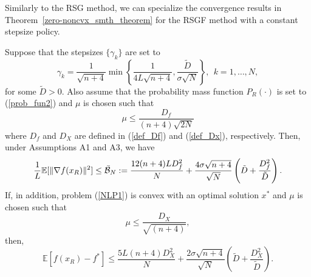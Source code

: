 \documentclass[final]{siamltex}
\newcommand{\beq}{\begin{equation}}
\newcommand{\eeq}{\end{equation}}
\def\eqnok#1{(\ref{#1})}
\def\vgap{\vspace*{.1in}}
\newcommand{\bbe}{\mathbb{E}}
\def\cB{{\cal B}}
\begin{document}
\vgap

Similarly to the RSG method, we can specialize the convergence results in
Theorem~\ref{zero-noncvx_smth_theorem} for the RSGF method with
a constant stepsize policy.

\begin{corollary}
Suppose that the stepsizes $\{\gamma_k\}$ are set to
\beq \label{zero_constant_step}
\gamma_k = \frac{1}{\sqrt{n+4}} \min \left\{ \frac{1}{4 L \sqrt{n+4}}, \frac{\tilde D}{\sigma \sqrt N}\right\}, \ \ k = 1, \ldots, N,
\eeq
for some $\tilde D >0$. Also assume that the probability mass function $P_R(\cdot)$
is set to \eqnok{prob_fun2} and $\mu$ is chosen such that
\beq \label{def_mu}
\mu \le \frac{D_f}{(n+4) \sqrt{2N}}
\eeq
where $D_f$ and $D_X$ are defined in \eqnok{def_Df} and \eqnok{def_Dx}, respectively.
Then, under Assumptions A1 and A3, we have
\beq \label{zero_nocvx_smooth}
\frac{1}{L} \bbe[\|\nabla f(x_R)\|^2] \le \bar {\cB}_N
:=\frac{12(n+4)L D_f^2}{N} + \frac{ 4 \sigma \sqrt {n+4} }{\sqrt{N}}\left(\tilde D + \frac{D_f^2}{\tilde D}\right) .
\eeq
If, in addition, problem \eqnok{NLP1} is convex with an optimal solution $x^*$
and $\mu$ is chosen such that
\[
\mu \le \frac{D_X}{\sqrt{(n+4)}},
\] then,
\beq \label{zero_cvx_smooth}
\bbe[f(x_R) - f^*] \le  \frac{5 L (n+4)D_X^2}{N} + \frac{2 \sigma \sqrt{n+4} }{\sqrt{N}}\left(\tilde D + \frac{D_X^2}{\tilde D}\right).
\eeq

\end{corollary}

\vgap
\end{document}
